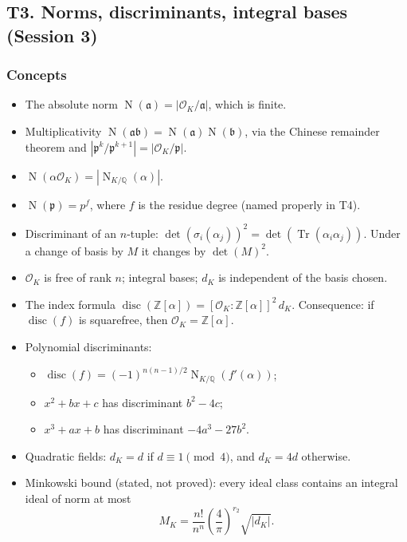 \documentclass[11pt]{article}
\newcommand{\Z}{\mathbb{Z}}
\newcommand{\Q}{\mathbb{Q}}
\newcommand{\OK}{\mathcal{O}_K}
\newcommand{\fp}{\mathfrak{p}}
\newcommand{\fa}{\mathfrak{a}}
\newcommand{\fb}{\mathfrak{b}}
\DeclareMathOperator{\Tr}{Tr}
\DeclareMathOperator{\Nm}{N}
\DeclareMathOperator{\disc}{disc}
\begin{document}
\subsection{T3. Norms, discriminants, integral bases (Session 3)}

\subsubsection*{Concepts}
\begin{itemize}
  \item The absolute norm $\Nm(\fa)=|\OK/\fa|$, which is finite.
  \item Multiplicativity $\Nm(\fa\fb)=\Nm(\fa)\Nm(\fb)$, via the Chinese remainder theorem and $|\fp^k/\fp^{k+1}|=|\OK/\fp|$.
  \item $\Nm(\alpha\OK)=|\Nm_{K/\Q}(\alpha)|$.
  \item $\Nm(\fp)=p^{f}$, where $f$ is the residue degree (named properly in T4).
  \item Discriminant of an $n$-tuple: $\det(\sigma_i(\alpha_j))^2=\det(\Tr(\alpha_i\alpha_j))$. Under a change of basis by $M$ it changes by $\det(M)^2$.
  \item $\OK$ is free of rank $n$; integral bases; $d_K$ is independent of the basis chosen.
  \item The index formula $\disc(\Z[\alpha])=[\OK:\Z[\alpha]]^2\,d_K$. Consequence: if $\disc(f)$ is squarefree, then $\OK=\Z[\alpha]$.
  \item Polynomial discriminants:
  \begin{itemize}
    \item $\disc(f)=(-1)^{n(n-1)/2}\Nm_{K/\Q}(f'(\alpha))$;
    \item $x^2+bx+c$ has discriminant $b^2-4c$;
    \item $x^3+ax+b$ has discriminant $-4a^3-27b^2$.
  \end{itemize}
  \item Quadratic fields: $d_K=d$ if $d\equiv1\pmod4$, and $d_K=4d$ otherwise.
  \item Minkowski bound (stated, not proved): every ideal class contains an integral ideal of norm at most
  \[
  M_K=\frac{n!}{n^n}\left(\frac4\pi\right)^{r_2}\sqrt{|d_K|}.
  \]
\end{itemize}
\end{document}
